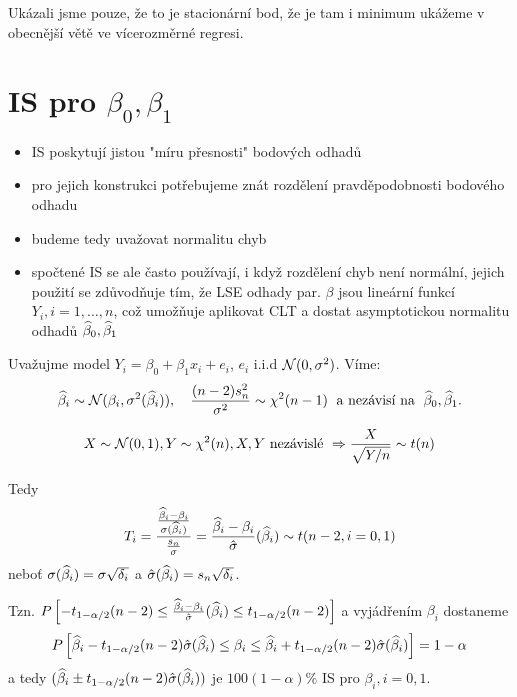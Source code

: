 \begin{remark}
	Ukázali jsme pouze, že to je stacionární bod, že je tam i minimum ukážeme v obecnější větě ve vícerozměrné regresi.
\end{remark}

\section{IS pro $\beta_0, \beta_1$}

\begin{itemize}
	\item IS poskytují jistou "míru přesnosti" bodových odhadů
	\item pro jejich konstrukci potřebujeme znát rozdělení pravděpodobnosti bodového odhadu
	\item budeme tedy uvažovat normalitu chyb
	\item spočtené IS se ale často používají, i když rozdělení chyb není normální, jejich použití se zdůvodňuje tím, že LSE odhady par. $\beta$ jsou lineární funkcí $Y_i, i = 1, \dots, n$, což umožňuje aplikovat CLT a dostat asymptotickou normalitu odhadů $\widehat{\beta}_0, \widehat{\beta}_1$
\end{itemize}

Uvažujme model $Y_i = \beta_0 + \beta_1 x_i + e_i$, $e_i$ i.i.d $\mathcal{N}(0,\sigma^2)$. Víme:
$$
	\widehat{\beta}_i \sim \mathcal{N}(\beta_i, \sigma^2(\widehat{\beta}_i)), \quad \frac{(n-2)s_n^2}{\sigma^2} \sim \chi^2(n-1) \text{\; a nezávisí na \;} \widehat{\beta}_0, \widehat{\beta}_1.
$$

\begin{remark}
	$$
		X \sim \mathcal{N}(0,1), Y \sim \chi^2(n), X, Y \text{ nezávislé } \Rightarrow \frac{X}{\sqrt{Y/n}} \sim t(n)
	$$
\end{remark}

Tedy
$$
	T_i = \frac{\frac{\widehat{\beta}_i - \beta_i}{\sigma(\widehat{\beta}_i)}}{\frac{s_n}{\sigma}} = \frac{\widehat{\beta}_i - \beta_i}{\hat{\sigma}}(\widehat{\beta}_i) \sim t(n-2, i = 0,1)
$$
neboť $\sigma(\widehat{\beta}_i) = \sigma \sqrt{\delta_i}$ a $\hat{\sigma}(\widehat{\beta}_i) = s_n \sqrt{\delta_i}$.

Tzn. $P \left[ -t_{1-\alpha/2}(n-2) \leq \frac{\widehat{\beta}_i - \beta_i}{\hat{\sigma}}(\widehat{\beta}_i) \leq t_{1-\alpha/2}(n-2) \right]$ a vyjádřením $\beta_i$ dostaneme
$$
	P \left[ \widehat{\beta}_i - t_{1-\alpha/2}(n-2) \hat{\sigma}(\widehat{\beta}_i) \leq \beta_i \leq  \widehat{\beta}_i + t_{1-\alpha/2}(n-2) \hat{\sigma}(\widehat{\beta}_i) \right] = 1 - \alpha
$$
a tedy $(\widehat{\beta}_i \pm t_{1-\alpha/2}(n-2) \hat{\sigma}(\widehat{\beta}_i))$ je $100(1-\alpha)\%$ IS pro $\beta_i, i = 0,1$.

